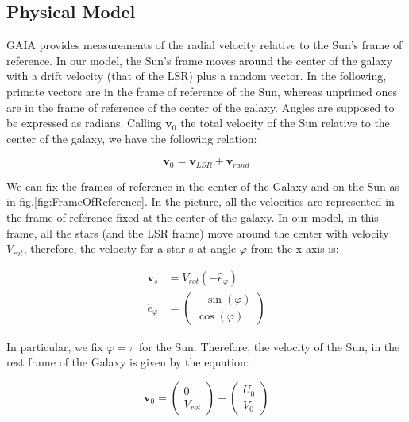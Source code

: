 
\subsection{Physical Model}

GAIA provides measurements of the radial velocity relative to the Sun's frame of reference. In our model, the Sun's frame moves around the center of the galaxy with a drift velocity (that of the LSR) plus a random vector.
In the following, primate vectors are in the frame of reference of the Sun, whereas unprimed ones are in the frame of reference of the center of the galaxy. Angles are supposed to be expressed as radians. 
Calling $\bm{v}_0$ the total velocity of the Sun relative to the center of the galaxy, we have the following relation:

\begin{equation}\label{eq:SunVelocity}
    \bm{v}_0 = \bm{v}_{LSR} + \bm{v}_{rand}
\end{equation}

\noindent
We can fix the frames of reference in the center of the Galaxy and on the Sun as in fig.\ref{fig:FrameOfReference}. In the picture, all the velocities are represented in the frame of reference fixed at the center of the galaxy. In our model, in this frame, all the stars (and the LSR frame) move around the center with velocity $V_{rot}$, therefore, the velocity for a star s at angle $\varphi$ from the x-axis is:

\begin{equation}\label{eq:VComponents}
    \begin{aligned}
        \bm{v}_s &= V_{rot} (-\hat{e}_{\varphi}) \\
        \hat{e}_{\varphi} &= \begin{pmatrix} -\sin(\varphi) \\ \cos(\varphi) \end{pmatrix}
    \end{aligned}
\end{equation}

\noindent
In particular, we fix $\varphi = \pi$ for the Sun. Therefore, the velocity of the Sun, in the rest frame of the Galaxy is given by the equation:

\begin{equation}\label{eq:VSun}
    \bm{v}_0 = \begin{pmatrix} 0 \\ V_{rot} \end{pmatrix} + \begin{pmatrix} U_0 \\ V_0 \end{pmatrix}
\end{equation}
 
